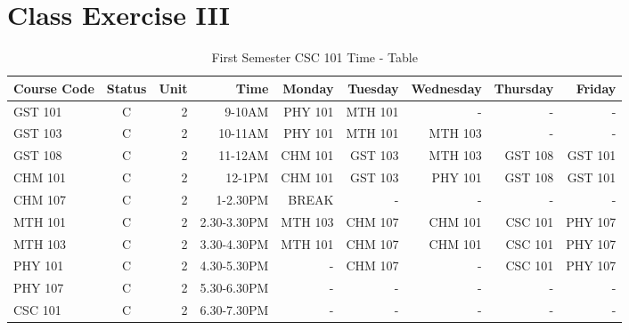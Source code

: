 \documentclass{article}
\begin{document}
\newpage
\section{Class Exercise III}
\begin{sidewaystable}[h!]
	\begin{center}
		\caption{First Semester CSC 101 Time - Table}
		\label{tab:table1}
		\begin{tabular}{l|c|r|r|r|r|r|r|r}
			\hline
			\textbf{\cellcolor{blue!25}Course Code} & \textbf{\cellcolor{blue!25}Status} & \textbf{\cellcolor{blue!25}Unit} & \textbf{\cellcolor{blue!25}Time} &
			\textbf{\cellcolor{green!20}Monday} &
			\textbf{\cellcolor{green!20}Tuesday} &
			\textbf{\cellcolor{green!20}Wednesday} &
			\textbf{\cellcolor{green!20}Thursday} &
			\textbf{\cellcolor{green!20}Friday}\\
			\hline
			\cellcolor{red!35}GST 101 & C & 2 & 9-10AM & PHY 101 & MTH 101 & - & - & -\\
			\cellcolor{red!35}GST 103 & C & 2 & 10-11AM & PHY 101 & MTH 101 & MTH 103 & - & -\\
			\cellcolor{red!35}GST 108 & C & 2 & 11-12AM & CHM 101 & GST 103 & MTH 103 & GST 108 & GST 101\\
			\cellcolor{red!35}CHM 101 & C & 2 & 12-1PM & CHM 101 & GST 103 & PHY 101 & GST 108 & GST 101\\
			\cellcolor{red!35}CHM 107 & C & 2 & 1-2.30PM & BREAK & - & - & - & -\\
			\cellcolor{red!35}MTH 101 & C & 2 & 2.30-3.30PM & MTH 103 & CHM 107 & CHM 101 & CSC 101 & PHY 107\\
			\cellcolor{red!35}MTH 103 & C & 2 & 3.30-4.30PM & MTH 101 & CHM 107 & CHM 101 & CSC 101 & PHY 107\\
			\cellcolor{red!35}PHY 101 & C & 2 & 4.30-5.30PM & - & CHM 107 & - & CSC 101 & PHY 107\\
			\cellcolor{red!35}PHY 107 & C & 2 & 5.30-6.30PM & - & - & - & - & -\\
			\cellcolor{red!35}CSC 101 & C & 2 & 6.30-7.30PM & - & - & - & - & -\\
			
		\end{tabular}
	\end{center}
\end{sidewaystable}
\end{document}
